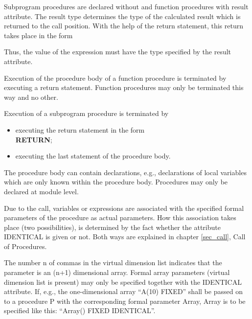 Subprogram procedures are declared without and function procedures with
result attribute. The result type determines the type of the calculated
result which is returned to the call position. With the help of the
return statement, this return takes place in the form



Thus, the value of the expression must have the type specified by the
result attribute.

Execution of the procedure body of a function procedure is terminated by
executing a return statement. Function procedures may only be terminated
this way and no other.

Execution of a subprogram procedure is terminated by
\begin{itemize}
\item executing the return statement in the form\\
      {\bf RETURN};\\
\item executing the last statement of the procedure body.
\end{itemize}

The procedure body can contain declarations, e.g., declarations of local
variables which are only known within the procedure body. 
Procedures may only be declared at module level.

Due to the call, variables or expressions are associated with the
specified formal parameters of the procedure as actual parameters. How
this association takes place (two possibilities), is determined by the
fact whether the attribute IDENTICAL is given or not. Both ways are
explained in chapter \ref{sec_call}, Call of Procedures.

The number n of commas in the virtual dimension list indicates that the
parameter is an (n+1) dimensional array. Formal array parameters
(virtual dimension list is present) may only be specified together with
the IDENTICAL attribute. If, e.g., the one-dimensional array ``A(10)
FIXED'' shall be passed on to a procedure P with the corresponding
formal parameter Array, Array is to be specified like this: ``Array()
FIXED IDENTICAL''.

